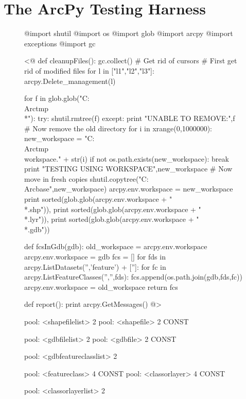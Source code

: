 \section{The ArcPy Testing Harness}

\begin{figure}
{\scriptsize
\begin{code}
@import shutil
@import os
@import glob
@import arcpy
@import exceptions
@import gc

<@
def cleanupFiles():
    gc.collect() \# Get rid of cursors
    \# First get rid of modified files
    for l in ["l1","l2","l3"]:
    	arcpy.Delete\_management(l)
    
    for f in glob.glob("C:\\Arctmp\\*"):
        try:
            shutil.rmtree(f)
        except:
            print "UNABLE TO REMOVE:",f
    \# Now remove the old directory
    for i in xrange(0,1000000):
        new\_workspace = "C:\\Arctmp\\workspace." + str(i)
        if not os.path.exists(new\_workspace):
            break             
    print "TESTING USING WORKSPACE",new\_workspace
    \# Now move in fresh copies
    shutil.copytree("C:\\Arcbase",new\_workspace)
    arcpy.env.workspace = new\_workspace
    print sorted(glob.glob(arcpy.env.workspace + "\\*.shp")),
    print sorted(glob.glob(arcpy.env.workspace + "\\*.lyr")),
    print sorted(glob.glob(arcpy.env.workspace + "\\*.gdb"))


def fcsInGdb(gdb):
    old\_workspace = arcpy.env.workspace
    arcpy.env.workspace = gdb
    fcs = []
    for fds in arcpy.ListDatasets('','feature') + ['']:
        for fc in arcpy.ListFeatureClasses('','',fds):
            fcs.append(os.path.join(gdb,fds,fc))
    arcpy.env.workspace = old\_workspace
    return fcs

def report():
    print arcpy.GetMessages()
@>

pool: <shapefilelist> 2
pool: <shapefile> 2 CONST

pool: <gdbfilelist> 2
pool: <gdbfile> 2 CONST

pool: <gdbfeatureclasslist> 2

pool: <featureclass> 4 CONST
pool: <classorlayer> 4 CONST

pool: <classorlayerlist> 2


\end{code}}
\end{figure}

